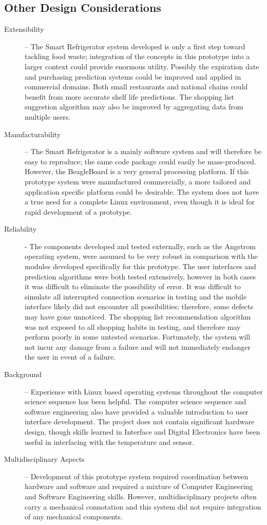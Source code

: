 \documentclass[11pt]{article} %
\begin{document}
\subsection{Other Design Considerations}
\begin{description}
\item[Extensibility] -- The Smart Refrigerator system developed is only a first step toward tackling food waste; integration of the concepts in this prototype into a larger context could provide enormous utility. Possibly the expiration date and purchasing prediction systems could be improved and applied in commercial domains. Both small restaurants and national chains could benefit from more accurate shelf life predictions. The shopping list suggestion algorithm may also be improved by aggregating data from multiple users.
\item[Manufacturability] -- The Smart Refrigerator is a mainly software system and will therefore be easy to reproduce; the same code package could easily be mass-produced. However, the BeagleBoard is a very general processing platform. If this prototype system were manufactured commercially, a more tailored and application specific platform could be desirable. The system does not have a true need for a  complete Linux environment, even though it is ideal for rapid development of a prototype.
\item[Reliability] - The components developed and tested externally, such as the Angstrom operating system, were assumed to be very robust in comparison with the modules developed specifically for this prototype. The user interfaces and prediction algorithms were both tested extensively, however in both cases it was difficult to eliminate the possibility of error. It was difficult to simulate all interrupted connection scenarios in testing and the mobile interface likely did not encounter all possibilities; therefore, some defects may have gone unnoticed. The shopping list recommendation algorithm was not exposed to all shopping habits in testing, and therefore may perform poorly in some untested scenarios. Fortunately, the system will not incur any damage from a failure and will not immediately endanger the user in event of a failure.
\item[Background] -- Experience with Linux based operating systems throughout the computer science sequence has been helpful. The computer science sequence and software engineering also have provided a valuable introduction to user interface development. The project does not contain significant hardware design, though skills learned in Interface and Digital Electronics have been useful in interfacing with the temperature and sensor.
\item[Multidisciplinary Aspects] -- Development of this prototype system required coordination between hardware and software and required a mixture of Computer Engineering and Software Engineering skills. However, multidisciplinary projects often carry a mechanical connotation and this system did not require integration of any mechanical components.
\end{description}
\end{document}
